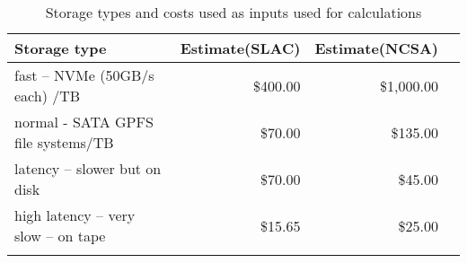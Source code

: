 \tiny \begin{longtable} { |p{}  |r  |r  |r |} 
\caption{Storage types and costs used as inputs used for calculations \label{tab:Storage}}\\ 
\hline 
\textbf{Storage type }&\textbf{Estimate(SLAC)}&\textbf{Estimate(NCSA)} \\ \hline
{fast -- NVMe (50GB/s each) /TB  }&{\$400.00}&{\$1,000.00} \\ \hline
{normal - SATA GPFS file systems/TB  }&{\$70.00}&{\$135.00} \\ \hline
{latency -- slower but on disk }&{\$70.00}&{\$45.00} \\ \hline
{high latency -- very slow -- on tape }&{\$15.65}&{\$25.00} \\ \hline
{}&{}&{} \\ \hline
\end{longtable} \normalsize
